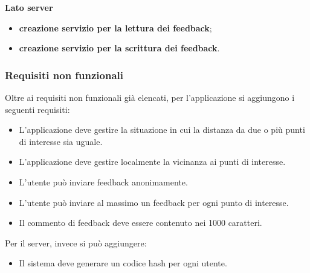 \textbf{Lato server}
\begin{itemize}
\item \textbf{creazione servizio per la lettura dei feedback};
\item \textbf{creazione servizio per la scrittura dei feedback}.
\end{itemize}


\subsubsection{Requisiti non funzionali}
Oltre ai requisiti non funzionali già elencati, per l'applicazione si aggiungono i seguenti requisiti:
\begin{itemize}
\item L'applicazione deve gestire la situazione in cui la distanza da due o più punti di interesse sia uguale.
\item L'applicazione deve gestire localmente la vicinanza ai punti di interesse.
\item L'utente può inviare feedback anonimamente.
\item L'utente può inviare al massimo un feedback per ogni punto di interesse.
\item Il commento di feedback deve essere contenuto nei 1000 caratteri.
\end{itemize}

Per il server, invece si può aggiungere:
\begin{itemize}
\item Il sistema deve generare un codice hash per ogni utente.
\end{itemize}



